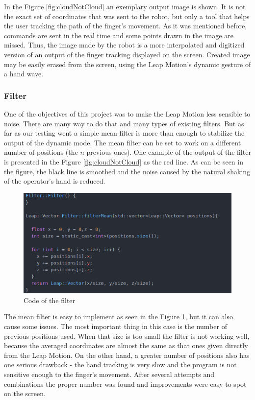 In the Figure \ref{fig:cloudNotCloud} an exemplary output image is shown. It is not the exact set of coordinates that was sent to the robot, but only a tool that helps the user tracking the path of the finger's movement. As it was mentioned before, commands are sent in the real time and some points drawn in the image are missed. Thus, the image made by the robot is a more interpolated and digitized version of an output of the finger tracking displayed on the screen. Created image may be easily erased from the screen, using the Leap Motion's dynamic gesture of a hand wave. 

\subsubsection{Filter}

One of the objectives of this project was to make the Leap Motion less sensible to noise. There are many way to do that and many types of existing filters. But as far as our testing went a simple mean filter is more than enough to stabilize the output of the dynamic mode. The mean filter can be set to work on a different number of positions (the $n$ previous ones).
One example of the output of the filter is presented in the Figure \ref{fig:cloudNotCloud} as the red line. As can be seen in the figure, the black line is smoothed and the noise caused by the natural shaking of the operator's hand is reduced.

\begin{figure}[H]
	\includegraphics[scale = 0.5]{codeFilter}
	\centering
	\caption{Code of the filter}
	\label{fig:filter}
\end{figure}

The mean filter is easy to implement as seen in the Figure \ref{fig:filter}, but it can also cause some issues. The most important thing in this case is the number of previous positions used. When that size is too small the filter is not working well, because the averaged coordinates are almost the same as that ones given directly from the Leap Motion. On the other hand, a greater number of positions also has one serious drawback - the hand tracking is very slow and the program is not sensitive enough to the finger's movement. After several attempts and combinations the proper number was found and improvements were easy to spot on the screen.
